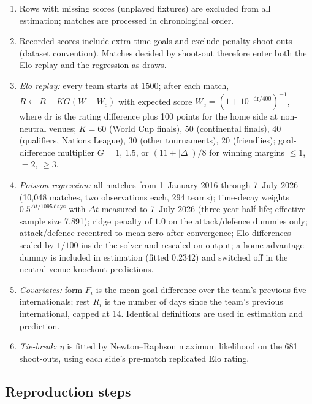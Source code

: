 \begin{enumerate}
  \item Rows with missing scores (unplayed fixtures) are excluded from all
        estimation; matches are processed in chronological order.
  \item Recorded scores include extra-time goals and exclude penalty
        shoot-outs (dataset convention). Matches decided by shoot-out
        therefore enter both the Elo replay and the regression as draws.
  \item \emph{Elo replay:} every team starts at 1500; after each match,
        $R \leftarrow R + K G (W - W_e)$ with expected score
        $W_e = (1 + 10^{-\mathrm{dr}/400})^{-1}$, where $\mathrm{dr}$ is the
        rating difference plus 100 points for the home side at non-neutral
        venues; $K = 60$ (World Cup finals), $50$ (continental finals),
        $40$ (qualifiers, Nations League), $30$ (other tournaments), $20$
        (friendlies); goal-difference multiplier $G = 1$, $1.5$, or
        $(11 + |\Delta|)/8$ for winning margins $\le 1$, $= 2$, $\ge 3$.
  \item \emph{Poisson regression:} all matches from 1~January 2016 through
        7~July 2026 (10{,}048 matches, two observations each, 294 teams);
        time-decay weights $0.5^{\Delta t / 1095\,\mathrm{days}}$ with
        $\Delta t$ measured to 7~July 2026 (three-year half-life; effective
        sample size 7{,}891); ridge penalty of $1.0$ on the attack/defence
        dummies only; attack/defence recentred to mean zero after
        convergence; Elo differences scaled by $1/100$ inside the solver
        and rescaled on output; a home-advantage dummy is included in
        estimation (fitted $0.2342$) and switched off in the neutral-venue
        knockout predictions.
  \item \emph{Covariates:} form $F_i$ is the mean goal difference over the
        team's previous five internationals; rest $R_i$ is the number of
        days since the team's previous international, capped at 14.
        Identical definitions are used in estimation and prediction.
  \item \emph{Tie-break:} $\eta$ is fitted by Newton--Raphson maximum
        likelihood on the 681 shoot-outs, using each side's pre-match
        replicated Elo rating.
\end{enumerate}

\subsection{Reproduction steps}
\label{app:steps}

